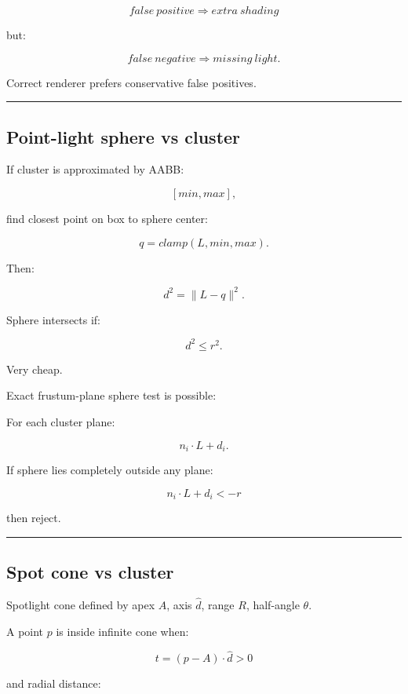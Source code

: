 \[
\boxed{
false\ positive
\Rightarrow
extra\ shading
}
\]

but:

\[
\boxed{
false\ negative
\Rightarrow
missing\ light.
}
\]

Correct renderer prefers conservative false positives.

\begin{center}\rule{0.5\linewidth}{0.5pt}\end{center}

\subsection{Point-light sphere vs cluster}\label{04-visual-computing-ii-ch040-point-light-sphere-vs-cluster}

If cluster is approximated by AABB:

\[
[min,max],
\]

find closest point on box to sphere center:

\[
q=
clamp(
L,
min,
max
).
\]

Then:

\[
d^2=
\|L-q\|^2.
\]

Sphere intersects if:

\[
\boxed{
d^2\le r^2.
}
\]

Very cheap.

Exact frustum-plane sphere test is possible:

For each cluster plane:

\[
n_i\cdot L+d_i.
\]

If sphere lies completely outside any plane:

\[
n_i\cdot L+d_i<-r
\]

then reject.

\begin{center}\rule{0.5\linewidth}{0.5pt}\end{center}

\subsection{Spot cone vs cluster}\label{04-visual-computing-ii-ch040-spot-cone-vs-cluster}

Spotlight cone defined by apex \(A\), axis \(\hat d\), range \(R\), half-angle \(\theta\).

A point \(p\) is inside infinite cone when:

\[
t=
(p-A)\cdot\hat d>0
\]

and radial distance:

